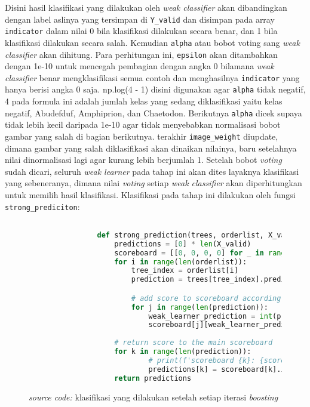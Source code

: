 		Disini hasil klasifikasi yang dilakukan oleh \emph{weak classifier} akan dibandingkan 
		dengan label aslinya yang tersimpan di \texttt{Y\_valid} dan disimpan pada array \texttt{indicator} 
		dalam nilai 0 bila klasifikasi dilakukan secara benar, dan 1 bila klasifikasi dilakukan 
		secara salah. Kemudian \texttt{alpha} atau bobot voting sang \emph{weak classifier} 
		akan dihitung. Para perhitungan ini, \texttt{epsilon} akan ditambahkan dengan 1e-10 
		untuk mencegah pembagian dengan angka 0 bilamana \emph{weak classifier} benar mengklasifikasi 
		semua contoh dan menghasilnya \texttt{indicator} yang hanya berisi angka 0 saja. np.log(4 - 1) 
		disini digunakan agar \texttt{alpha} tidak negatif, 4 pada formula ini adalah jumlah kelas 
		yang sedang diklasifikasi yaitu kelas negatif, Abudefduf, Amphiprion, dan Chaetodon. Berikutnya 
		\texttt{alpha} dicek supaya tidak lebih kecil daripada 1e-10 agar tidak menyebabkan normalisasi 
		bobot gambar yang salah di bagian berikutnya. terakhir \texttt{image\_weight} diupdate, dimana gambar 
		yang salah diklasifikasi akan dinaikan nilainya, baru setelahnya nilai dinormalisasi lagi 
		agar kurang lebih berjumlah 1. Setelah bobot \textit{voting} sudah dicari, seluruh 
		\emph{weak learner} pada tahap ini akan dites layaknya klasifikasi yang sebeneranya, dimana 
		nilai \textit{voting} setiap \emph{weak classifier} akan diperhitungkan untuk memilih 
		hasil klasifikasi. Klasifikasi pada tahap ini dilakukan oleh fungsi \texttt{strong\_prediciton}:

		\begin{figure}[H]
			\begin{lstlisting}[language=Python, basicstyle=\tiny]

				def strong_prediction(trees, orderlist, X_valid, alpha_list):
					predictions = [0] * len(X_valid)
					scoreboard = [[0, 0, 0, 0] for _ in range(len(X_valid))]
					for i in range(len(orderlist)):
						tree_index = orderlist[i]
						prediction = trees[tree_index].predict(X_valid)

						# add score to scoreboard according to results and alpha value of tree
						for j in range(len(prediction)):
							weak_learner_prediction = int(prediction[j])
							scoreboard[j][weak_learner_prediction] += 1 * alpha_list[i]
					
					# return score to the main scoreboard
					for k in range(len(prediction)):
							# print(f'scoreboard {k}: {scoreboard[k]}')
							predictions[k] = scoreboard[k].index(max(scoreboard[k]))
					return predictions

			\end{lstlisting}
			\caption{\emph{source code:} klasifikasi yang dilakukan setelah setiap iterasi \emph{boosting}}
			\label{code: strong prediction}
		\end{figure}


